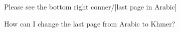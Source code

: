 \documentclass[xetex,serif]{beamer}
\begin{document}
    \begin{frame}
        \begin{theorem}
            Please see the bottom right conner/[\alert{last page in Arabic}]\newline
        \end{theorem}
    \end{frame}
    \begin{frame}
        \begin{theorem}
            How can I change the \alert{last page} from Arabic to Khmer?
        \end{theorem}
    \end{frame}
\end{document}
